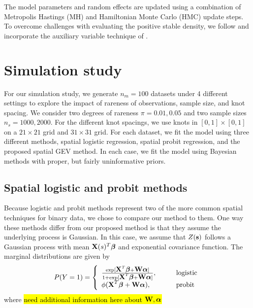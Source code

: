 \documentclass[11pt]{article}
\begin{document}
The model parameters and random effects are updated using a combination of Metropolis Hastings (MH) and Hamiltonian Monte Carlo (HMC) update steps.
To overcome challenges with evaluating the positive stable density, we follow \citet{Reich2012} and incorporate the auxiliary variable technique of \citet{Stephenson2009}.


\section{Simulation study}\label{s:sim}

For our simulation study, we generate $n_m = 100$ datasets under 4 different settings to explore the impact of rareness of observations, sample size, and knot spacing.
We consider two degrees of rareness $\pi = 0.01, 0.05$ and two sample sizes $n_s = 1000, 2000$.
For the different knot spacings, we use knots in $[0, 1] \times [0, 1]$ on a $21 \times 21$ grid and $31 \times 31$ grid.
For each dataset, we fit the model using three different methods, spatial logistic regression, spatial probit regression, and the proposed spatial GEV method.
In each case, we fit the model using Bayesian methods with proper, but fairly uninformative priors.


\subsection{Spatial logistic and probit methods}
Because logistic and probit methods represent two of the more common spatial techniques for binary data, we chose to compare our method to them.
One way these methods differ from our proposed method is that they assume the underlying process is Gaussian.
In this case, we assume that $Z(\mbox{\bf s})$ follows a Gaussian process with mean $\mbox{\bf X}(s)^T \mbox{\boldmath $\beta$}$ and exponential covariance function.
The marginal distributions are given by
\begin{align}
  P(Y = 1) = \left\{ \begin{array}{ll}
    \frac{\exp[\mbox{\bf X}^T \mbox{\boldmath $\beta$} + \mbox{\bf W} \mbox{\boldmath $\alpha$}]}{1 + \exp[\mbox{\bf X}^T \mbox{\boldmath $\beta$} + \mbox{\bf W} \mbox{\boldmath $\alpha$}]}, \qquad &\text{logistic}\\
    \phi(\mbox{\bf X}^T \mbox{\boldmath $\beta$} + \mbox{\bf W} \mbox{\boldmath $\alpha$}), \qquad &\text{probit}
  \end{array}\right.
\end{align}
where \hl{need additional information here about $\mbox{\bf W}, \mbox{\boldmath $\alpha$}$}
\end{document}
